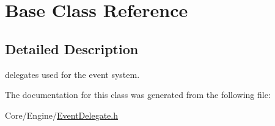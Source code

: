 \hypertarget{classBase}{\section{Base Class Reference}
\label{classBase}
}


\subsection{Detailed Description}
delegates used for the event system. 

The documentation for this class was generated from the following file\-:\begin{DoxyCompactItemize}
\item 
Core/\-Engine/\hyperlink{EventDelegate_8h}{Event\-Delegate.\-h}\end{DoxyCompactItemize}

